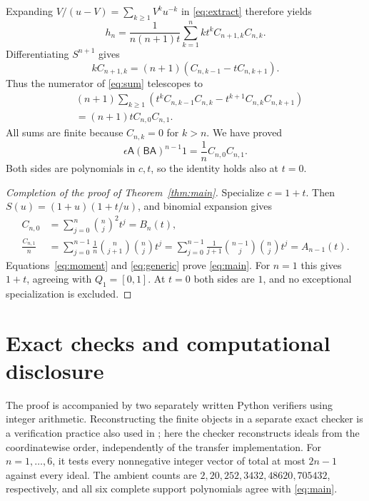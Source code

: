 \documentclass[11pt]{article}
\newcommand{\A}{\mathsf A}
\newcommand{\B}{\mathsf B}
\begin{document}
Expanding $V/(u-V)=\sum_{k\geq1}V^ku^{-k}$ in \eqref{eq:extract}
therefore yields
\begin{equation}\label{eq:sum}
 h_n=\frac{1}{n(n+1)t}
       \sum_{k=1}^n k t^k C_{n+1,k}C_{n,k}.
\end{equation}
Differentiating $S^{n+1}$ gives
\[
 kC_{n+1,k}=(n+1)(C_{n,k-1}-tC_{n,k+1}).
\]
Thus the numerator of \eqref{eq:sum} telescopes to
\begin{align*}
 &(n+1)\sum_{k\geq1}
 \left(t^k C_{n,k-1}C_{n,k}-t^{k+1}C_{n,k}C_{n,k+1}\right)\\
 &=(n+1)tC_{n,0}C_{n,1}.
\end{align*}
All sums are finite because $C_{n,k}=0$ for $k>n$. We have proved
\begin{equation}\label{eq:generic}
 \epsilon\A(\B\A)^{n-1}1=\frac{1}{n}C_{n,0}C_{n,1}.
\end{equation}
Both sides are polynomials in $c,t$, so the identity holds also at $t=0$.

\begin{proof}[Completion of the proof of Theorem~\ref{thm:main}]
Specialize $c=1+t$. Then $S(u)=(1+u)(1+t/u)$, and binomial expansion gives
\begin{align*}
 C_{n,0}&=\sum_{j=0}^n\binom nj^2t^j=B_n(t),\\
 \frac{C_{n,1}}{n}
 &=\sum_{j=0}^{n-1}\frac{1}{n}\binom n{j+1}\binom nj t^j
 =\sum_{j=0}^{n-1}\frac{1}{j+1}\binom{n-1}j\binom nj t^j
 =A_{n-1}(t).
\end{align*}
Equations~\eqref{eq:moment} and \eqref{eq:generic} prove \eqref{eq:main}.
For $n=1$ this gives $1+t$, agreeing with $Q_1=[0,1]$. At $t=0$ both
sides are $1$, and no exceptional specialization is excluded.
\end{proof}

\section{Exact checks and computational disclosure}
The proof is accompanied by two separately written Python verifiers
using integer arithmetic. Reconstructing the finite objects in a separate
exact checker is a verification practice also used in
\cite[Section~6]{ZengEtAl26}; here the checker reconstructs ideals from
the coordinatewise order, independently of the transfer implementation.
For $n=1,\ldots,6$, it tests every nonnegative integer vector of total
at most $2n-1$ against every ideal. The ambient counts are
$2,20,252,3432,48620,705432$, respectively, and all six complete support
polynomials agree with \eqref{eq:main}.
\end{document}
